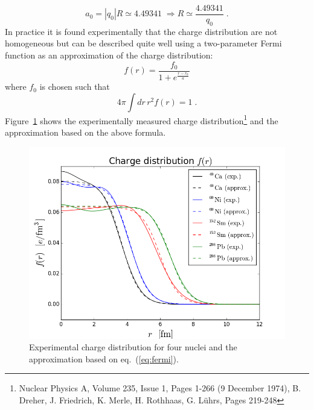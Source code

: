 \documentclass[12pt]{article}
\begin{document}
\[a_0=|q_0|R\simeq 4.49341\;\Rightarrow R\simeq\frac{4.49341}{q_0}\;.\] 
In practice it is found experimentally that the charge distribution are not homogeneous but can be described quite well using a two-parameter Fermi function as an approximation of the charge distribution: 
\begin{equation}\label{eq:fermi}
f(r)=\frac{f_0}{1+e^{\frac{r-r_0}{a}}}
\end{equation}
where $f_0$ is chosen such that 
\[4\pi\int dr \,r^2 f(r)=1\;.\]
Figure~\ref{fig:chargeDistribution} shows the experimentally measured charge distribution\footnote{Nuclear Physics A, Volume 235, Issue 1, Pages 1-266 (9 December 1974), B. Dreher, J. Friedrich, K. Merle, H. Rothhaas, G. Lührs, Pages 219-248} and the approximation based on the above formula. 
\begin{figure}
\includegraphics[scale=0.6]{images/ChargeDistribution.png}
\caption{Experimental charge distribution for four nuclei and the approximation based on eq.~(\ref{eq:fermi}). }\label{fig:chargeDistribution}
\end{figure}
%
%
%
%
\end{document}
